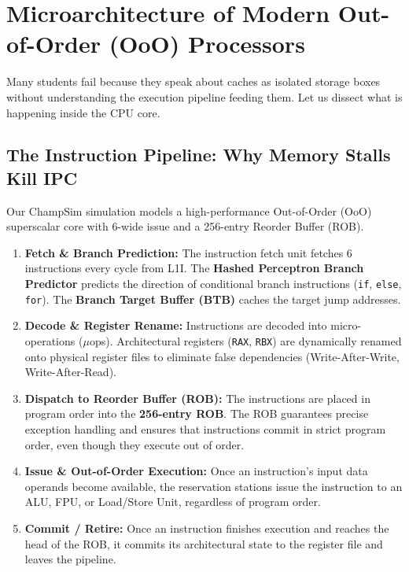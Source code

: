 \documentclass[11pt, a4paper]{article}
\begin{document}
\newpage

\section{Microarchitecture of Modern Out-of-Order (OoO) Processors}

Many students fail because they speak about caches as isolated storage boxes without understanding the execution pipeline feeding them. Let us dissect what is happening inside the CPU core.

\subsection{The Instruction Pipeline: Why Memory Stalls Kill IPC}
Our ChampSim simulation models a high-performance Out-of-Order (OoO) superscalar core with 6-wide issue and a 256-entry Reorder Buffer (ROB).

\begin{enumerate}[leftmargin=1.5em]
  \item \textbf{Fetch \& Branch Prediction:} The instruction fetch unit fetches 6 instructions every cycle from L1I. The \textbf{Hashed Perceptron Branch Predictor} predicts the direction of conditional branch instructions (\texttt{if}, \texttt{else}, \texttt{for}). The \textbf{Branch Target Buffer (BTB)} caches the target jump addresses.
  \item \textbf{Decode \& Register Rename:} Instructions are decoded into micro-operations ($\mu$ops). Architectural registers (\texttt{RAX}, \texttt{RBX}) are dynamically renamed onto physical register files to eliminate false dependencies (Write-After-Write, Write-After-Read).
  \item \textbf{Dispatch to Reorder Buffer (ROB):} The instructions are placed in program order into the \textbf{256-entry ROB}. The ROB guarantees precise exception handling and ensures that instructions commit in strict program order, even though they execute out of order.
  \item \textbf{Issue \& Out-of-Order Execution:} Once an instruction's input data operands become available, the reservation stations issue the instruction to an ALU, FPU, or Load/Store Unit, regardless of program order.
  \item \textbf{Commit / Retire:} Once an instruction finishes execution and reaches the head of the ROB, it commits its architectural state to the register file and leaves the pipeline.
\end{enumerate}
\end{document}
